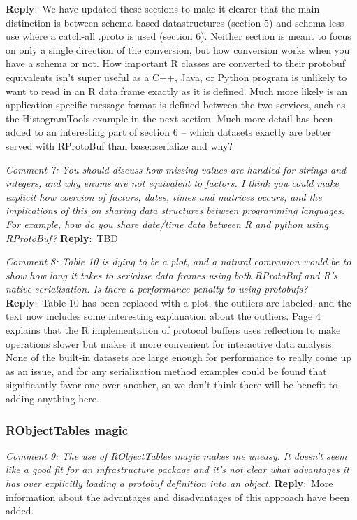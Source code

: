 \documentclass[10pt]{article}
\newcommand{\pointRaised}[2]{\smallskip %
  \textsl{{\fontseries{b}\selectfont #1}: #2}\newline}
\newcommand{\reply}[1]{\textbf{Reply}:\ #1 \smallskip } %
\begin{document}
\reply{We have updated these sections to make it clearer that the main
  distinction is between schema-based datastructures (section 5) and
  schema-less use where a catch-all .proto is used (section 6).
  Neither section is meant to focus on only a single direction of the
  conversion, but how conversion works when you have a schema or not.
  How important R classes are converted to their protobuf equivalents
  isn't super useful as a C++, Java, or Python program is unlikely to
  want to read in an R data.frame exactly as it is defined.  Much more
  likely is an application-specific message format is defined between the
  two services, such as the HistogramTools example in the next section.
  Much more detail has been added to an interesting part of section 6 --
  which datasets exactly are better served with RProtoBuf than
  base::serialize and why?}

\pointRaised{Comment 7}{You should discuss how missing values are handled for strings and
  integers, and why enums are not equivalent to factors. I think you
  could make explicit how coercion of factors, dates, times and matrices
  occurs, and the implications of this on sharing data structures
  between programming languages. For example, how do you share date/time
  data between R and python using RProtoBuf?}
\reply{TBD}

\pointRaised{Comment 8}{Table 10 is dying to be a plot, and a natural companion would be to
  show how long it takes to serialise data frames using both RProtoBuf
  and R's native serialisation. Is there a performance penalty to using
  protobufs?}
\reply{Table 10 has been replaced with a plot, the outliers are
  labeled, and the text now includes some interesting explanation
  about the outliers.  Page 4 explains that the R implementation of
  protocol buffers uses reflection to make operations slower but makes
  it more convenient for interactive data analysis.  None of the
  built-in datasets are large enough for performance to really come up
  as an issue, and for any serialization method examples could be
  found that significantly favor one over another, so we don't think
  there will be benefit to adding anything here.
}

\subsubsection*{RObjectTables magic}

\pointRaised{Comment 9}{The use of RObjectTables magic makes me uneasy. It doesn't seem like a
  good fit for an infrastructure package and it's not clear what
  advantages it has over explicitly loading a protobuf definition into
  an object.}
\reply{More information about the advantages and disadvantages of this
  approach have been added.}
\end{document}
